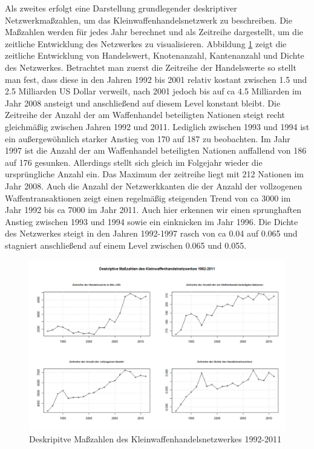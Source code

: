 \documentclass[a4paper,ngerman,oneside,titlepage,bibliography=totoc,11pt]{scrreprt}
\begin{document}
Als zweites erfolgt eine Darstellung grundlegender deskriptiver Netzwerkmaßzahlen, um das Kleinwaffenhandelsnetzwerk zu beschreiben. Die Maßzahlen werden für jedes Jahr berechnet und als Zeitreihe dargestellt, um die zeitliche Entwicklung des Netzwerkes zu visualisieren. 
Abbildung \ref{fig:ts_descriptives} zeigt die zeitliche Entwicklung  von Handelswert, Knotenanzahl, Kantenanzahl und Dichte des Netzwerkes. Betrachtet man zuerst die Zeitreihe der Handelswerte so stellt man fest, dass diese in den Jahren 1992 bis 2001 relativ kostant zwischen 1.5 und 2.5 Milliarden US Dollar verweilt, nach 2001 jedoch bis auf ca 4.5 Milliarden im Jahr 2008 ansteigt und anschließend auf diesem Level konstant bleibt.
Die Zeitreihe der Anzahl der am Waffenhandel beteiligten Nationen steigt recht gleichmäßig zwischen Jahren 1992 und 2011. Lediglich zwischen 1993 und 1994 ist ein außergewöhnlich starker Anstieg von 170 auf 187 zu beobachten. Im Jahr 1997 ist die Anzahl der am Waffenhandel beteiligten Nationen auffallend von 186 auf 176 gesunken. Allerdings stellt sich gleich im Folgejahr wieder die ursprüngliche Anzahl ein. Das Maximum der zeitreihe liegt mit 212 Nationen im Jahr 2008.
Auch die Anzahl der Netzwerkkanten die der Anzahl der vollzogenen Waffentransaktionen zeigt einen regelmäßig steigenden Trend von ca 3000 im Jahr 1992 bis ca 7000 im Jahr 2011. Auch hier erkennen wir einen sprunghaften Anstieg zwischen 1993 und 1994 sowie ein einknicken im Jahr 1996.
Die Dichte des Netzwerkes steigt in den Jahren 1992-1997 rasch von ca 0.04 auf 0.065 und stagniert anschließend auf einem Level zwischen 0.065 und 0.055.
\begin{figure}[h]
	\centering
		\includegraphics[width=1.00\textwidth]{Grafiken/ts_descriptives.png}
	\caption{Deskripitve Maßzahlen des Kleinwaffenhandelsnetzwerkes 1992-2011}
	\label{fig:ts_descriptives}
\end{figure}
\end{document}
